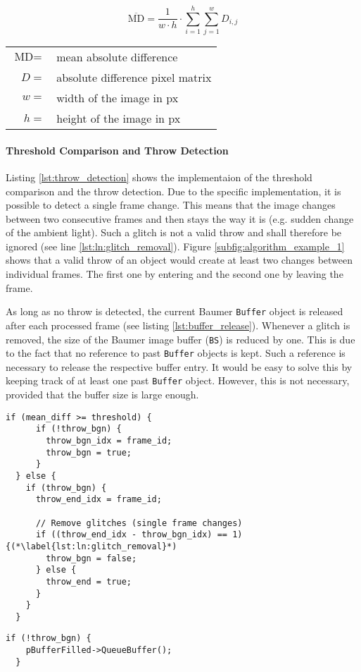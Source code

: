 \begin{equation}
  \overline{\text{MD}} = \frac{1}{w\cdot h} \cdot \sum\limits_{i=1}^h \sum\limits_{j=1}^w D_{i,j}
  \label{eq:mean_diff}
\end{equation}

\begin{tabular}{rl}
  $\text{MD} =$ & mean absolute difference \\
  $D =$ & absolute difference pixel matrix \\
  $w =$ & width of the image in px \\
  $h =$ & height of the image in px \\
\end{tabular}

\paragraph{Threshold Comparison and Throw Detection}
Listing \ref{lst:throw_detection} shows the implementaion of the threshold comparison and the throw detection.
Due to the specific implementation, it is possible to detect a single frame change.
This means that the image changes between two consecutive frames and then stays the way it is (e.g. sudden change of the ambient light).
Such a glitch is not a valid throw and shall therefore be ignored (see line \ref{lst:ln:glitch_removal}).
Figure \ref{subfig:algorithm_example_1} shows that a valid throw of an object would create at least two changes between individual frames.
The first one by entering and the second one by leaving the frame.

As long as no throw is detected, the current Baumer \texttt{Buffer} object is released after each processed frame (see listing \ref{lst:buffer_release}).
Whenever a glitch is removed, the size of the Baumer image buffer (\texttt{BS}) is reduced by one.
This is due to the fact that no reference to past \texttt{Buffer} objects is kept.
Such a reference is necessary to release the respective buffer entry.
It would be easy to solve this by keeping track of at least one past \texttt{Buffer} object.
However, this is not necessary, provided that the buffer size is large enough.

\clearpage

\begin{lstlisting}[style=C++, caption={Throw detection and glitch removal}, label=lst:throw_detection]
  if (mean_diff >= threshold) {
      if (!throw_bgn) {
        throw_bgn_idx = frame_id;
        throw_bgn = true;
      }
  } else {
    if (throw_bgn) {
      throw_end_idx = frame_id;

      // Remove glitches (single frame changes)
      if ((throw_end_idx - throw_bgn_idx) == 1) {(*\label{lst:ln:glitch_removal}*)
        throw_bgn = false;
      } else {
        throw_end = true;
      }
    }
  }
\end{lstlisting}

\begin{lstlisting}[style=C++, caption={Release of the filled Baumer \texttt{Buffer} object}, label=lst:buffer_release]
  if (!throw_bgn) {
    pBufferFilled->QueueBuffer();
  }
\end{lstlisting}
